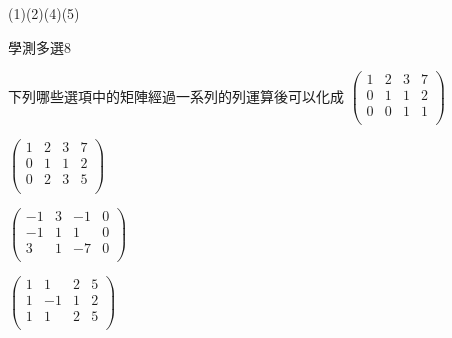 \begin{QUESTIONS}
\begin{QUESTION}
        \begin{QFROMS}
        \end{QFROMS}
        \begin{QTAGS}\end{QTAGS}
        \begin{QANS}
            (1)(2)(4)(5)
        \end{QANS}
        \begin{QSOLLIST}
        \end{QSOLLIST}
        \begin{QEMPTYSPACE}
        \end{QEMPTYSPACE}
    \end{QUESTION}
    \begin{QUESTION}
        \begin{ExamInfo}{96}{學測}{多選}{8}
        \end{ExamInfo}
        \begin{ExamAnsRateInfo}{30}{36}{32}{22}
        \end{ExamAnsRateInfo}
        \begin{QBODY}
            下列哪些選項中的矩陣經過一系列的列運算後可以化成
			$\left( \begin{array}{cccc} 1 & 2 & 3 & 7 \\0 & 1 & 1 & 2 \\0 & 0 & 1 & 1 \\\end{array}\right)$

			\begin{QOPS} 
				\QOP $\left( \begin{array}{cccc} 1 & 2 & 3 & 7 \\0 & 1 & 1 & 2 \\0 & 2 & 3 & 5 \\\end{array}\right)$

				\QOP $\left( \begin{array}{cccc} -1 & 3 & -1 & 0 \\-1 & 1 & 1 & 0 \\3 & 1 & -7 & 0 \\\end{array}\right)$

				\QOP $\left( \begin{array}{cccc} 1 & 1 & 2 & 5 \\1 & -1 & 1 & 2 \\1 & 1 & 2 & 5 \\\end{array}\right)$


\end{QOPS}
\end{QBODY}
\end{QUESTION}
\end{QUESTIONS}
